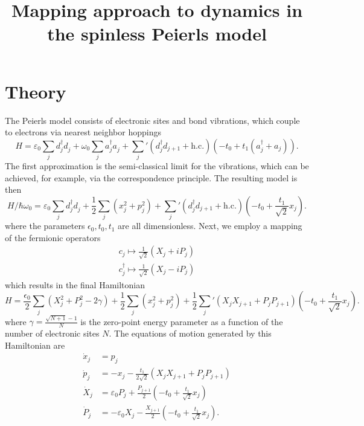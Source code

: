 \documentclass{article}
\newcommand{\pdagger}{{\phantom{\dagger}}}
\begin{document}
\title{Mapping approach to dynamics in the spinless Peierls model}
\maketitle
\section{Theory}
The Peierls model consists of electronic sites and bond vibrations, which couple to electrons via nearest neighbor hoppings
\begin{equation}
	H = \varepsilon_0 \sum_j  d^\dagger_j d_j^\pdagger + \omega_0 \sum_j a_j^\dagger a_j^\pdagger + \sum_{j}' (d_j^\dagger d_{j+1} + \mathrm{h.c.})( -t_0 + t_1(a_j^\dagger + a_j)).
\end{equation}
The first approximation is the semi-classical limit for the vibrations, which can be achieved, for example, via the correspondence principle. The resulting model is then
\begin{equation}
	H/{\hbar\omega_0} = \varepsilon_0 \sum_j  d^\dagger_j d_j^\pdagger + \frac{1}{2} \sum_j (x_j^2+p_j^2) + \sum_{j}' (d_j^\dagger d_{j+1} + \mathrm{h.c.})( -t_0 + \frac{t_1}{\sqrt{2}}x_j).
\end{equation}
where the parameters $\epsilon_0,t_0,t_1$ are all dimensionless.
Next, we employ a mapping of the fermionic operators
\begin{align}
	c_j\mapsto \frac{1}{\sqrt{2}} (X_j+iP_j)\\
	c_j^\dagger \mapsto \frac{1}{\sqrt{2}} (X_j-iP_j)
\end{align}
which results in the final Hamiltonian
\begin{equation}
	H = \frac{\epsilon_0}{2} \sum_j  (X_j^2+P_j^2-2\gamma) + \frac{1}{2} \sum_j (x_j^2+p_j^2) + \frac{1}{2}\sum_{j}' (X_j X_{j+1} + P_j P_{j+1})( -t_0 + \frac{t_1}{\sqrt{2}}x_j).
\end{equation}
where $\gamma=\frac{\sqrt{N+1}-1}{N}$ is the zero-point energy parameter as a function of the number of electronic sites $N$. 
The equations of motion generated by this Hamiltonian are
\begin{align}
	\dot{x}_j &= p_j \\
	\dot{p}_j &= -x_j - \frac{t_1}{2\sqrt{2}}(X_j X_{j+1} + P_j P_{j+1}) \\
	\dot{X}_j &= \varepsilon_0 P_j + \frac{P_{j+1}}{2}(-t_0 + \frac{t_1}{\sqrt{2}}x_j)\\
	\dot{P}_j &= -\varepsilon_0 X_j - \frac{X_{j+1}}{2} (-t_0+\frac{t_1}{\sqrt{2}}x_j).
\end{align}
\end{document}
